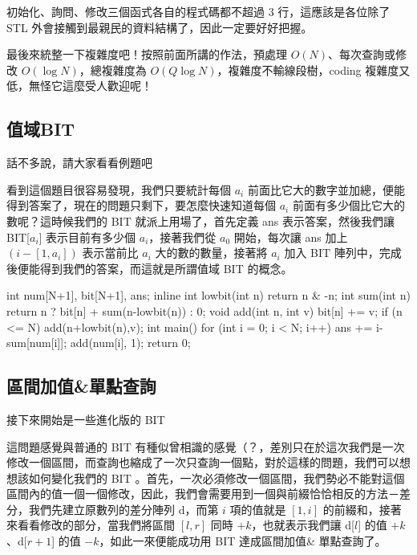 \documentclass[main.tex]{subfiles}
\begin{document}
\par 初始化、詢問、修改三個函式各自的程式碼都不超過 $3$ 行，這應該是各位除了 STL 外會接觸到最親民的資料結構了，因此一定要好好把握。

\par 最後來統整一下複雜度吧！按照前面所講的作法，預處理 $O(N)$、每次查詢或修改 $O(\log{N})$，總複雜度為 $O(Q\log{N})$，複雜度不輸線段樹，coding 複雜度又低，無怪它這麼受人歡迎呢！

\subsection{值域BIT}
話不多說，請大家看看例題吧
\par 看到這個題目很容易發現，我們只要統計每個 $a_i$ 前面比它大的數字並加總，便能得到答案了，現在的問題只剩下，要怎麼快速知道每個 $a_i$ 前面有多少個比它大的數呢？這時候我們的 BIT 就派上用場了，首先定義 ans 表示答案，然後我們讓 BIT[$a_i$] 表示目前有多少個 $a_i$，接著我們從 $a_0$ 開始，每次讓 ans 加上 $(i - [1, a_i])$ 表示當前比 $a_i$ 大的數的數量，接著將 $a_i$ 加入 BIT 陣列中，完成後便能得到我們的答案，而這就是所謂值域 BIT 的概念。
\begin{C++}
int num[N+1], bit[N+1], ans;
inline int lowbit(int n) {return n & -n;}
int sum(int n) {
  return n ? bit[n] + sum(n-lowbit(n)) : 0;
}
void add(int n, int v) {
  bit[n] += v;
  if (n <= N) add(n+lowbit(n),v);
}
int main() {
  for (int i = 0; i < N; i++) {
    ans += i-sum[num[i]];
    add(num[i], 1);
  } 
  return 0;
}
\end{C++}
\subsection{區間加值\&單點查詢}
接下來開始是一些進化版的 BIT
\par 這問題感覺與普通的 BIT 有種似曾相識的感覺（？，差別只在於這次我們是一次修改一個區間，而查詢也縮成了一次只查詢一個點，對於這樣的問題，我們可以想想該如何變化我們的 BIT 。首先，一次必須修改一個區間，我們勢必不能對這個區間內的值一個一個修改，因此，我們會需要用到一個與前綴恰恰相反的方法－差分，我們先建立原數列的差分陣列 d，而第 $i$ 項的值就是 $[1, i]$ 的前綴和，接著來看看修改的部分，當我們將區間 $[l, r]$ 同時 $+k$，也就表示我們讓 d[$l$] 的值 $+k$、d[$r+1$] 的值 $-k$，如此一來便能成功用 BIT 達成區間加值\& 單點查詢了。
\end{document}
